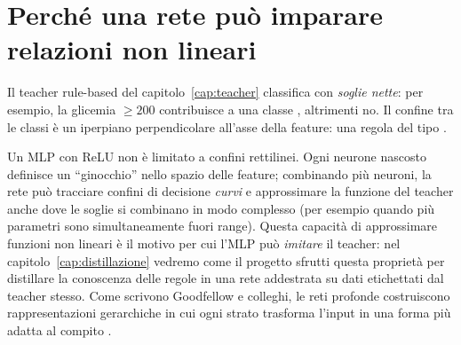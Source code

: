 \section{Perché una rete può imparare relazioni non lineari}\label{sec:relazioni-non-lineari}

Il teacher rule-based del capitolo~\ref{cap:teacher} classifica con
\emph{soglie nette}: per esempio, la glicemia $\geq 200$ contribuisce a una
classe , altrimenti no. Il confine tra le classi è un
iperpiano perpendicolare all'asse della feature: una regola del tipo
.

Un MLP con ReLU non è limitato a confini rettilinei. Ogni neurone nascosto
definisce un ``ginocchio'' nello spazio delle feature; combinando più
neuroni, la rete può tracciare confini di decisione \emph{curvi} e
approssimare la funzione del teacher anche dove le soglie si combinano in
modo complesso (per esempio quando più parametri sono simultaneamente fuori
range). Questa capacità di approssimare funzioni non lineari è il motivo per
cui l'MLP può \emph{imitare} il teacher: nel capitolo~\ref{cap:distillazione}
vedremo come il progetto sfrutti questa proprietà per distillare la
conoscenza delle regole in una rete addestrata su dati etichettati dal
teacher stesso. Come scrivono Goodfellow e colleghi, le reti profonde
costruiscono rappresentazioni gerarchiche in cui ogni strato trasforma
l'input in una forma più adatta al compito \cite{goodfellow2016deep}.